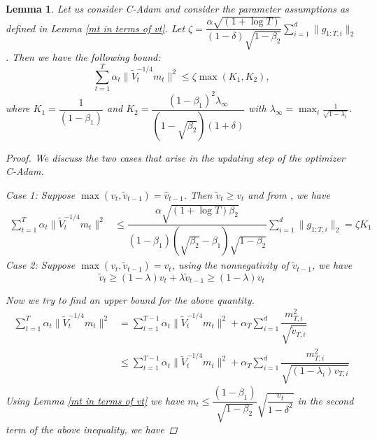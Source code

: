 \documentclass[12pt]{article}
\newtheorem{lem}[thm]{Lemma}%
\begin{document}
\begin{lem}\label{proof for bound}
Let us consider C-Adam and consider the parameter assumptions as defined in Lemma \ref{mt in terms of vt}. Let $\zeta = \dfrac{\alpha \sqrt{(1+\log T)}}{(1-\delta)\sqrt{1-\beta_2}}\displaystyle\sum_{i=1}^d{\lVert g_{1:T, i}\rVert_{2}}$. Then we have the following bound:
 $$\sum_{t=1}^T {\alpha_{t}\lVert \tilde{V}_{t}^{-1/4}m_{t} \rVert^2} \leq \zeta \max( K_1, K_2),$$
 where $K_1 = \dfrac{1}{(1-\beta_{1})}$ and  $K_2 = \dfrac{(1-\beta_{1})^{2}\lambda_{\infty}}{(1-\sqrt{\beta_{2}})(1+\delta)}$ with $\lambda_\infty=\displaystyle\max_i\frac{1}{\sqrt{1-\lambda_i}}$.

\begin{proof}
We discuss the two cases that arise in the updating step of the optimizer C-Adam.

\textit{Case 1:} Suppose $\max(v_{t}, \tilde{v}_{t-1}) = \hat{v}_{t-1}$. Then $\tilde{v}_{t} \geq v_{t}$ and from \cite{ReddiKaleKumar2019}, we have
\begin{align*}
    \sum_{t=1}^T{\alpha_{t}\lVert \tilde{V}_{t}^{-1/4}m_{t} \rVert^2} &\leq \dfrac{\alpha\sqrt{(1+\log{T})\beta_{2}}}{(1-\beta_{1})(\sqrt{\beta_2}-\beta_{1})\sqrt{1-\beta_{2}}}\sum_{i=1}^d{\lVert g_{1:T, i}\rVert_{2}}=\zeta K_1
\end{align*}
\textit{Case 2: } Suppose $\max(v_{t}, \tilde{v}_{t-1}) = v_{t}$, using the nonnegativity of $\tilde{v}_{t-1}$, we have
$$\tilde{v}_{t} \geq (1-\lambda)v_{t} + \lambda\tilde{v}_{t-1}\geq (1-\lambda)v_{t}$$
    
Now we try to find an upper bound for the above quantity.
\begin{align*}
    \sum_{t=1}^T{\alpha_{t}\lVert \tilde{V}_{t}^{-1/4}m_{t} \rVert^2} &= \sum_{t=1}^{T-1}{\alpha_{t}\lVert \tilde{V}_{t}^{-1/4}m_{t} \rVert^2} + \alpha_{T}\sum_{i=1}^d \dfrac{m_{T,i}^2}{\sqrt{\tilde{v}_{T,i}}} \\
    &\leq \sum_{t=1}^{T-1}{\alpha_{t}\lVert \tilde{V}_{t}^{-1/4}m_{t} \rVert^2} + \alpha_{T}\sum_{i=1}^d \dfrac{m_{T,i}^2}{\sqrt{(1-\lambda_{i})v_{T,i}}}
\end{align*}
Using Lemma \ref{mt in terms of vt} we have $m_{t} \leq  \dfrac{(1-\beta_{1})}{\sqrt{1-\beta_{2}}}\sqrt{\dfrac{v_{t}}{1-\delta^2}}$ in the second term of the above inequality, we have


\end{proof}
\end{lem}
\end{document}

